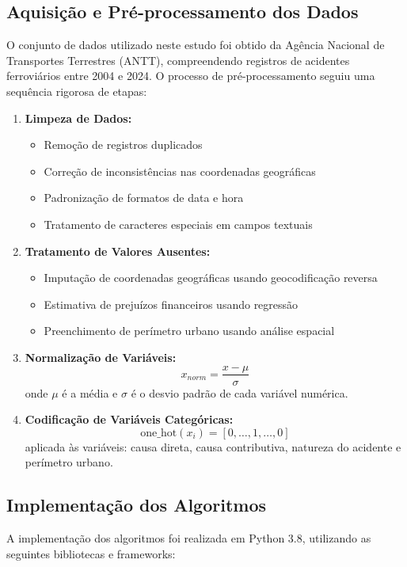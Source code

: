 \documentclass[conference]{IEEEtran}
\begin{document}
\subsection{Aquisição e Pré-processamento dos Dados}
O conjunto de dados utilizado neste estudo foi obtido da Agência Nacional de Transportes Terrestres (ANTT), compreendendo registros de acidentes ferroviários entre 2004 e 2024.
O processo de pré-processamento seguiu uma sequência rigorosa de etapas:

\begin{enumerate}
\item \textbf{Limpeza de Dados:}
   \begin{itemize}
   \item Remoção de registros duplicados
   \item Correção de inconsistências nas coordenadas geográficas
   \item Padronização de formatos de data e hora
   \item Tratamento de caracteres especiais em campos textuais
   \end{itemize}

\item \textbf{Tratamento de Valores Ausentes:}
   \begin{itemize}
   \item Imputação de coordenadas geográficas usando geocodificação reversa
   \item Estimativa de prejuízos financeiros usando regressão
   \item Preenchimento de perímetro urbano usando análise espacial
   \end{itemize}

\item \textbf{Normalização de Variáveis:}
   \begin{equation}
   x_{norm} = \frac{x - \mu}{\sigma}
   \end{equation}
   onde $\mu$ é a média e $\sigma$ é o desvio padrão de cada variável numérica.

\item \textbf{Codificação de Variáveis Categóricas:}
   \begin{equation}
   \text{one\_hot}(x_i) = [0,\ldots,1,\ldots,0]
   \end{equation}
   aplicada às variáveis: causa direta, causa contributiva, natureza do acidente e perímetro urbano.
\end{enumerate}

\subsection{Implementação dos Algoritmos}
A implementação dos algoritmos foi realizada em Python 3.8, utilizando as seguintes bibliotecas e frameworks:
\end{document}
